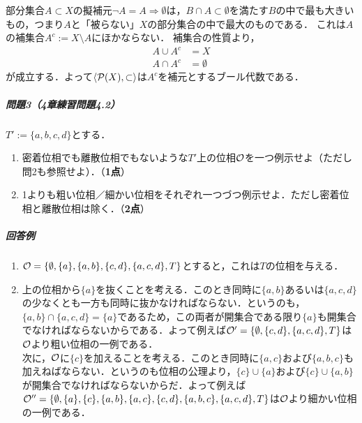 \documentclass[11pt,a4paper]{jsarticle}
\begin{document}
部分集合$A \subset X$の擬補元$\neg A = A \Rightarrow \emptyset$は，$B \cap A \subset \emptyset$を満たす$B$の中で最も大きいもの，つまり$A$と「被らない」$X$の部分集合の中で最大のものである．
これは$A$の補集合$A^c:= X \setminus A$にほかならない．
補集合の性質より，
\begin{align*}
 A \cup A^c &= X \\
 A \cap A^c &= \emptyset 
\end{align*}
が成立する．よって$\langle \mathcal{P}(X), \subset \rangle$は$A^c$を補元とするブール代数である．






\subparagraph{問題3（4章練習問題4.2）}
$T':=\{a, b, c, d\}$とする．
\begin{enumerate}
 \item 密着位相でも離散位相でもないような$T'$上の位相$\mathcal{O}$を一つ例示せよ（ただし問2も参照せよ）．（\textbf{1点}）
 \item 1よりも粗い位相／細かい位相をそれぞれ一つづつ例示せよ．ただし密着位相と離散位相は除く．（\textbf{2点}）
\end{enumerate}


\subparagraph{回答例}
\begin{enumerate}
 \item $\mathcal{O} = \{ \emptyset, \{a\}, \{a,b\}, \{c,d\}, \{a, c, d\}, T\}$とすると，これは$T$の位相を与える．
 \item 上の位相から$\{a\}$を抜くことを考える．このとき同時に$\{a,b\}$あるいは$\{a, c, d\}$の少なくとも一方も同時に抜かなければならない．というのも，$\{a,b\} \cap \{a, c, d\} = \{a\}$であるため，この両者が開集合である限り$\{a\}$も開集合でなければならないからである．よって例えば$\mathcal{O}' = \{ \emptyset, \{c,d\}, \{a, c, d\}, T\}$は$\mathcal{O}$より粗い位相の一例である．\\
       次に，$\mathcal{O}$に$\{c\}$を加えることを考える．このとき同時に$\{a,c\}$および$\{a, b, c\}$も加えねばならない．というのも位相の公理より，$\{c\} \cup \{a\}$および$\{c\} \cup \{a,b\}$が開集合でなければならないからだ．よって例えば$\mathcal{O}'' = \{ \emptyset, \{a\}, \{c\}, \{a,b\}, \{a,c\}, \{c,d\}, \{a, b, c\}, \{a, c, d\}, T\}$は$\mathcal{O}$より細かい位相の一例である．
\end{enumerate}
\end{document}
